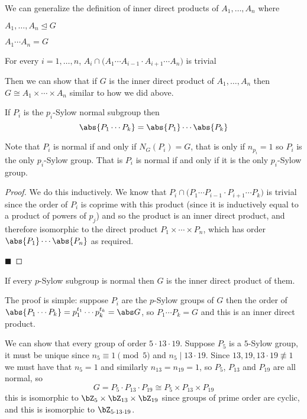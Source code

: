 \documentclass[10pt]{article}
\let\divides=\mid
\let\normalsub=\trianglelefteq
\begin{document}
We can generalize the definition of inner direct products of $A_1,\dots,A_n$ where
\benum
    \item $A_1,\dots,A_n\normalsub G$
    \item $A_1\cdots A_n=G$
    \item For every $i=1,\dots,n$, $A_i\cap\bigl(A_1\cdots A_{i-1}\cdot A_{i+1}\cdots A_n\bigr)$ is trivial
\eenum

Then we can show that if $G$ is the inner direct product of $A_1,\dots,A_n$ then $G\cong A_1\times\cdots\times A_n$ similar to how we did above.

\begin{prop*}

    If $P_i$ is the $p_i$-Sylow normal subgroup then
    \[ \abs{P_1\cdots P_k}=\abs{P_1}\cdots\abs{P_k} \]

\end{prop*}

Note that $P_i$ is normal if and only if $N_G(P_i)=G$, that is only if $n_{p_i}=1$ so $P_i$ is the only $p_i$-Sylow group.
That is $P_i$ is normal if and only if it is the only $p_i$-Sylow group.

\begin{proof}

    We do this inductively.
    We know that $P_i\cap\bigl(P_1\cdots P_{i-1}\cdot P_{i+1}\cdots P_k\bigr)$ is trivial since the order of $P_i$ is coprime with this product (since it is inductively equal to a product of powers of $p_j$)
    and so the product is an inner direct product, and therefore isomorphic to the direct product $P_1\times\cdots\times P_n$, which has order $\abs{P_1}\cdots\abs{P_n}$ as required.

    \hfill$\blacksquare$

\end{proof}

\begin{prop*}

    If every $p$-Sylow subgroup is normal then $G$ is the inner direct product of them.

\end{prop*}


The proof is simple: suppose $P_i$ are the $p$-Sylow groups of $G$ then the order of $\abs{P_1\cdots P_k}=p_1^{t_1}\cdots p_k^{t_k}=\abs G$, so $P_1\cdots P_k=G$ and this is an inner direct product.

\begin{exam}

    We can show that every group of order $5\cdot13\cdot19$.
    Suppose $P_5$ is a $5$-Sylow group, it must be unique since $n_5\equiv 1\pmod5$ and $n_5\divides 13\cdot19$.
    Since $13,19,13\cdot19\not\equiv1$ we must have that $n_5=1$ and similarly $n_{13}=n_{19}=1$, so $P_5$, $P_{13}$ and $P_{19}$ are all normal, so
    \[ G = P_5\cdot P_{13}\cdot P_{19} \cong P_5\times P_{13}\times P_{19} \]
    this is isomorphic to $\bZ_5\times\bZ_{13}\times\bZ_{19}$ since groups of prime order are cyclic, and this is isomorphic to $\bZ_{5\cdot13\cdot19}$.

\end{exam}
\end{document}
